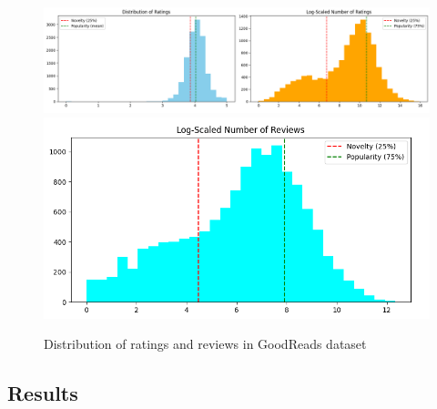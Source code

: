 \documentclass[\myFontSize,a4paper,oneside,hidelinks]{article}
\begin{document}

\begin{figure}[H]
	\centering
	\includegraphics[width=\linewidth,keepaspectratio]{img/ratings_novelty_popularity2.png}
	\includegraphics[width=\dimexpr0.5\linewidth\relax,keepaspectratio]{img/ratings_novelty_popularity3.png}
	\caption{Distribution of ratings and reviews in GoodReads dataset}
	\label{fig:ratings_chart}
\end{figure}


\subsection{Results}
\end{document}
